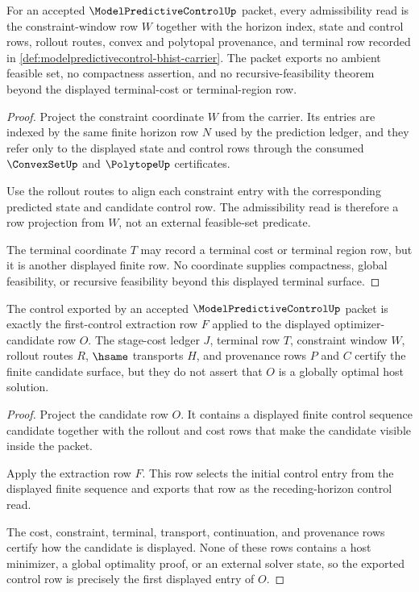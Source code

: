\begin{theorem}
\label{thm:modelpredictivecontrol-constraint-ledger}
For an accepted $\ModelPredictiveControlUp$ packet, every admissibility read
is the constraint-window row $W$ together with the horizon index, state and
control rows, rollout routes, convex and polytopal provenance, and terminal
row recorded in \autoref{def:modelpredictivecontrol-bhist-carrier}. The packet
exports no ambient feasible set, no compactness assertion, and no
recursive-feasibility theorem beyond the displayed terminal-cost or
terminal-region row.
\end{theorem}
\begin{proof}
Project the constraint coordinate $W$ from the carrier. Its entries are
indexed by the same finite horizon row $N$ used by the prediction ledger, and
they refer only to the displayed state and control rows through the consumed
$\ConvexSetUp$ and $\PolytopeUp$ certificates.

Use the rollout routes to align each constraint entry with the corresponding
predicted state and candidate control row. The admissibility read is therefore
a row projection from $W$, not an external feasible-set predicate.

The terminal coordinate $T$ may record a terminal cost or terminal region row,
but it is another displayed finite row. No coordinate supplies compactness,
global feasibility, or recursive feasibility beyond this displayed terminal
surface.
\end{proof}

\begin{theorem}
\label{thm:modelpredictivecontrol-receding-horizon-boundary}
The control exported by an accepted $\ModelPredictiveControlUp$ packet is
exactly the first-control extraction row $F$ applied to the displayed
optimizer-candidate row $O$. The stage-cost ledger $J$, terminal row $T$,
constraint window $W$, rollout routes $R$, $\hsame$ transports $H$, and
provenance rows $P$ and $C$ certify the finite candidate surface, but they do
not assert that $O$ is a globally optimal host solution.
\end{theorem}
\begin{proof}
Project the candidate row $O$. It contains a displayed finite control sequence
candidate together with the rollout and cost rows that make the candidate
visible inside the packet.

Apply the extraction row $F$. This row selects the initial control entry from
the displayed finite sequence and exports that row as the receding-horizon
control read.

The cost, constraint, terminal, transport, continuation, and provenance rows
certify how the candidate is displayed. None of these rows contains a host
minimizer, a global optimality proof, or an external solver state, so the
exported control row is precisely the first displayed entry of $O$.
\end{proof}

